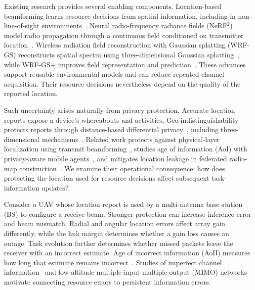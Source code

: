 \documentclass[conference]{IEEEtran}
\begin{document}
Existing research provides several enabling components. Location-based beamforming learns resource decisions from spatial information, including in non-line-of-sight environments~\cite{lemagoarou2022location}. Neural radio-frequency radiance fields (NeRF$^2$) model radio propagation through a continuous field conditioned on transmitter location~\cite{zhao2023nerf2}. Wireless radiation field reconstruction with Gaussian splatting (WRF-GS) reconstructs spatial spectra using three-dimensional Gaussian splatting~\cite{wen2025wrfgs}, while WRF-GS+ improves field representation and prediction~\cite{wen2026wrfgsplus}. These advances support reusable environmental models and can reduce repeated channel acquisition. Their resource decisions nevertheless depend on the quality of the reported location.

Such uncertainty arises naturally from privacy protection. Accurate location reports expose a device's whereabouts and activities. Geo-indistinguishability protects reports through distance-based differential privacy~\cite{andres2013geo}, including three-dimensional mechanisms~\cite{min2022three}. Related work protects against physical-layer localization using transmit beamforming~\cite{checa2020privacy}, studies age of information (AoI) with privacy-aware mobile agents~\cite{jin2021privacy}, and mitigates location leakage in federated radio-map construction~\cite{tian2025geometry}. We examine their operational consequence: how does protecting the location used for resource decisions affect subsequent task-information updates?

Consider a UAV whose location report is used by a multi-antenna base station (BS) to configure a receive beam. Stronger protection can increase inference error and beam mismatch. Radial and angular location errors affect array gain differently, while the link margin determines whether a gain loss causes an outage. Task evolution further determines whether missed packets leave the receiver with an incorrect estimate. Age of incorrect information (AoII) measures how long that estimate remains incorrect~\cite{maatouk2020aoii}. Studies of imperfect channel information~\cite{chen2021imperfect} and low-altitude multiple-input multiple-output (MIMO) networks~\cite{chen2025air} motivate connecting resource errors to persistent information errors.
\end{document}
